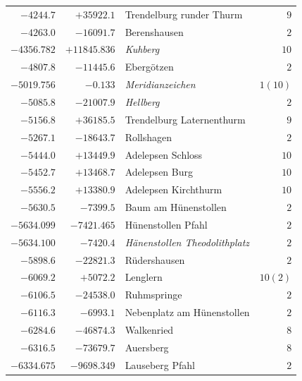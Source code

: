 \begin{center}
\begin{tabular}{r|r|p{170pt}|r}
\(-4244.7\)&\(+35922.1\)&Trendelburg runder Thurm&\(9\)\\
\(-4263.0\)&\(-16091.7\)&Berenshausen&\(2\)\\
\(-4356.782\)&\(+11845.836\)&\textit{Kuhberg}&\(10\)\\
\(-4807.8\)&\(-11445.6\)&Ebergötzen&\(2\)\\
\(-5019.756\)&\(-0.133\)&\textit{Meridianzeichen}&\(1(10)\)\\
\(-5085.8\)&\(-21007.9\)&\textit{Hellberg}&\(2\)\\
\(-5156.8\)&\(+36185.5\)&Trendelburg Laternenthurm&\(9\)\\
\(-5267.1\)&\(-18643.7\)&Rollshagen&\(2\)\\
\(-5444.0\)&\(+13449.9\)&Adelepsen Schloss&\(10\)\\
\(-5452.7\)&\(+13468.7\)&Adelepsen Burg&\(10\)\\
\(-5556.2\)&\(+13380.9\)&Adelepsen Kirchthurm&\(10\)\\
\(-5630.5\)&\(-7399.5\)&Baum am Hünenstollen&\(2\)\\
\(-5634.099\)&\(-7421.465\)&Hünenstollen Pfahl&\(2\)\\
\(-5634.100\)&\(-7420.4\)&\textit{Hänenstollen Theodolithplatz}&\(2\)\\
\(-5898.6\)&\(-22821.3\)&Rüdershausen&\(2\)\\
\(-6069.2\)&\(+5072.2\)&Lenglern&\(10 (2)\)\\
\(-6106.5\)&\(-24538.0\)&Ruhmspringe&\(2\)\\
\(-6116.3\)&\(-6993.1\)&Nebenplatz am Hünenstollen&\(2\)\\
\(-6284.6\)&\(-46874.3\)&Walkenried&\(8\)\\
\(-6316.5\)&\(-73679.7\)&Auersberg&\(8\)\\
\(-6334.675\)&\(-9698.349\)&Lauseberg Pfahl&\(2\)\\
\hline\end{tabular}\endgroup\end{center}
\clearpage
